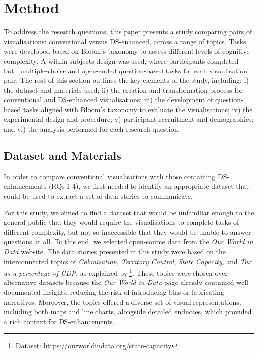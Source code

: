 \section{Method}
To address the research questions, this paper presents a study comparing pairs of visualisations: conventional versus DS-enhanced, across a range of topics. Tasks were developed based on Bloom's taxonomy to assess different levels of cognitive complexity. A within-subjects design was used, where participants completed both multiple-choice and open-ended question-based tasks for each visualisation pair.
The rest of this section outlines the key elements of the study, including: i) the dataset and materials used; ii) the creation and transformation process for conventional and DS-enhanced visualisations; iii) the development of question-based tasks aligned with Bloom's taxonomy to evaluate the visualisations; iv) the experimental design and procedure; v) participant recruitment and demographics; and vi) the analysis performed for each research question.

\subsection{Dataset and Materials}
\label{dataset}
In order to compare conventional visualisations with those containing DS-enhancements (RQs 1-4), we first needed to identify an appropriate dataset that could be used to extract a set of data stories to communicate.

For this study, we aimed to find a dataset that would be unfamiliar enough to the general public that they would require the visualisations to complete tasks of different complexity, but not so inaccessible that they would be unable to answer questions at all. To this end, we selected open-source data from the \textit{Our World in Data} website. The data stories presented in this study were based on the interconnected topics of \textit{Colonisation}, \textit{Territory Control}, \textit{State Capacity}, and \textit{Tax as a percentage of GDP}, as explained by \citet{herre2023statecap}\footnote{Dataset: \url{https://ourworldindata.org/state-capacity}}. These topics were chosen over alternative datasets because the \textit{Our World in Data} page already contained well-documented insights, reducing the risk of introducing bias or fabricating narratives. Moreover, the topics offered a diverse set of visual representations, including both maps and line charts, alongside detailed endnotes, which provided a rich context for DS-enhancements.

